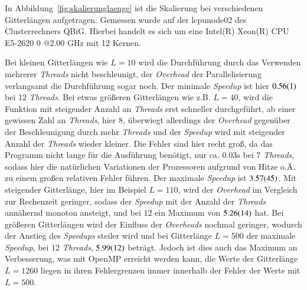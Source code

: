 	In Abbildung~\ref{fig:skalierunglaenge} ist die Skalierung bei verschiedenen Gitterlängen aufgetragen. Gemessen wurde auf der lcpunode02 des Clusterrechners QBiG. Hierbei handelt es sich um eine Intel(R) Xeon(R) CPU E5-2620 0 @2.00 GHz mit 12 Kernen.%
	
	Bei kleinen Gitterlängen wie $L=10$ wird die Durchführung durch das Verwenden mehrerer \textit{Threads} nicht beschleunigt, der \textit{Overhead} der Parallelisierung verlangsamt die Durchführung sogar noch. Der minimale \textit{Speedup} ist hier $\num{0,56\pm0,01}$ bei 12 \textit{Threads}. Bei etwas größeren Gitterlängen wie z.{}B.{} $L=40$, wird die Funktion mit steigender Anzahl an \textit{Threads} erst schneller durchgeführt, ab einer gewissen Zahl an \textit{Threads}, hier $8$, überwiegt allerdings der \textit{Overhead} gegenüber der Beschleunigung durch mehr \textit{Threads} und der \textit{Speedup} wird mit steigender Anzahl der \textit{Threads} wieder kleiner. Die Fehler sind hier recht groß, da das Programm nicht lange für die Ausführung benötigt, nur ca.{} $\num{0,03}\si{\second}$ bei $7$ \textit{Threads}, sodass hier die natürlichen Variationen der Prozessoren aufgrund von Hitze o.{}Ä.{} zu einem großen relativen Fehler führen. Der maximale \textit{Speedup} ist $\num{3,57\pm0,45}$. Mit steigender Gitterlänge, hier im Beispiel $L=110$, wird der \textit{Overhead} im Vergleich zur Rechenzeit geringer, sodass der \textit{Speedup} mit der Anzahl der \textit{Threads} annähernd monoton ansteigt, und bei $12$ ein Maximum von $\num{5,26\pm0,14}$ hat.
	Bei größeren Gitterlängen wird der Einfluss der \textit{Overheads} nochmal geringer, wodurch der Anstieg des \textit{Speedups} steiler wird und bei Gitterlänge $L=500$ der maximale \textit{Speedup}, bei $12$ \textit{Threads}, $\num{5,99\pm0,12}$ beträgt. Jedoch ist dies auch das Maximum an Verbesserung, was mit OpenMP erreicht werden kann, die Werte der Gitterlänge $L=1260$ liegen in ihren Fehlergrenzen immer innerhalb der Fehler der Werte mit $L=500$.
 	
	
	
